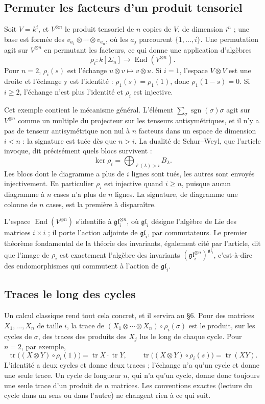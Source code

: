 \documentclass[11pt,a4paper]{amsart}
\theoremstyle{definition}
\theoremstyle{plain}
\theoremstyle{remark}
\newcommand{\gl}{\mathfrak{gl}}
\newcommand{\End}{\operatorname{End}}
\newcommand{\sgn}{\operatorname{sgn}}
\newcommand{\tr}{\operatorname{tr}}
\begin{document}
\subsection{Permuter les facteurs d'un produit tensoriel}

Soit $V = k^i$, et $V^{\otimes n}$ le produit tensoriel de $n$ copies de $V$, de dimension $i^n$ ; une base est formée des $v_{a_1} \otimes \cdots \otimes v_{a_n}$, où les $a_j$ parcourent $\{1, \dots, i\}$. Une permutation agit sur $V^{\otimes n}$ en permutant les facteurs, ce qui donne une application d'algèbres
\[
\rho_i \colon k[\Sigma_n] \to \End(V^{\otimes n}).
\]
Pour $n = 2$, $\rho_i(s)$ est l'échange $u \otimes v \mapsto v \otimes u$. Si $i = 1$, l'espace $V \otimes V$ est une droite et l'échange y est l'identité : $\rho_1(s) = \rho_1(1)$, donc $\rho_1(1 - s) = 0$. Si $i \ge 2$, l'échange n'est plus l'identité et $\rho_i$ est injective.

Cet exemple contient le mécanisme général. L'élément $\sum_\sigma \sgn(\sigma)\sigma$ agit sur $V^{\otimes n}$ comme un multiple du projecteur sur les tenseurs antisymétriques, et il n'y a pas de tenseur antisymétrique non nul à $n$ facteurs dans un espace de dimension $i < n$ : la signature est tuée dès que $n > i$. La dualité de Schur--Weyl, que l'article invoque, dit précisément quels blocs survivent :
\[
\ker \rho_i = \bigoplus_{\ell(\lambda) > i} B_\lambda .
\]
Les blocs dont le diagramme a plus de $i$ lignes sont tués, les autres sont envoyés injectivement. En particulier $\rho_i$ est injective quand $i \ge n$, puisque aucun diagramme à $n$ cases n'a plus de $n$ lignes. La signature, de diagramme une colonne de $n$ cases, est la première à disparaître.

L'espace $\End(V^{\otimes n})$ s'identifie à $\gl_i^{\otimes n}$, où $\gl_i$ désigne l'algèbre de Lie des matrices $i \times i$ ; il porte l'action adjointe de $\gl_i$, par commutateurs. Le premier théorème fondamental de la théorie des invariants, également cité par l'article, dit que l'image de $\rho_i$ est exactement l'algèbre des invariants $(\gl_i^{\otimes n})^{\gl_i}$, c'est-à-dire des endomorphismes qui commutent à l'action de $\gl_i$.

\subsection{Traces le long des cycles}

Un calcul classique rend tout cela concret, et il servira au \S6. Pour des matrices $X_1, \dots, X_n$ de taille $i$, la trace de $(X_1 \otimes \cdots \otimes X_n) \circ \rho_i(\sigma)$ est le produit, sur les cycles de $\sigma$, des traces des produits des $X_j$ lus le long de chaque cycle. Pour $n = 2$, par exemple,
\[
\tr\bigl((X \otimes Y) \circ \rho_i(1)\bigr) = \tr X \cdot \tr Y, \qquad \tr\bigl((X \otimes Y) \circ \rho_i(s)\bigr) = \tr(XY).
\]
L'identité a deux cycles et donne deux traces ; l'échange n'a qu'un cycle et donne une seule trace. Un cycle de longueur $n$, qui n'a qu'un cycle, donne donc toujours une seule trace d'un produit de $n$ matrices. Les conventions exactes (lecture du cycle dans un sens ou dans l'autre) ne changent rien à ce qui suit.
\end{document}
